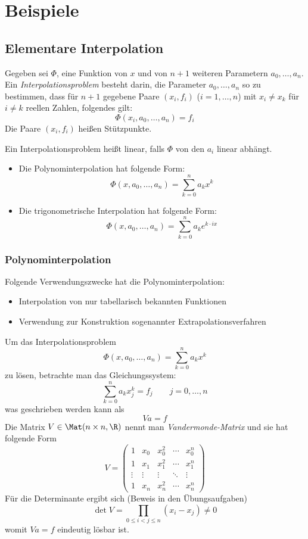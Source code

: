 \documentclass[a4paper]{scrartcl}
\numberwithin{equation}{section}
\begin{document}
\section{Beispiele}

\subsection{Elementare Interpolation}

Gegeben sei $\Phi$, eine Funktion von $x$ und von $n+1$ weiteren Parametern $a_0,\dotsc, a_n$.
Ein \emph{Interpolationsproblem} besteht darin, die Parameter $a_0,\dotsc, a_n$ so zu bestimmen, dass für $n+1$ gegebene Paare $(x_i, f_i)$ ($i=1,\dotsc,n$) mit $x_i\neq x_k$ für $i\neq k$ reellen Zahlen, folgendes gilt:
\begin{equation}
	\label{eq:5.1}
	\Phi(x_i, a_0,\dotsc, a_n) = f_i
\end{equation}
Die Paare $(x_i, f_i)$ heißen Stützpunkte.

Ein Interpolationsproblem heißt linear, falls $\Phi$ von den $a_i$ linear abhängt.

\begin{ex*}
	\begin{itemize}
		\item
			Die Polynominterpolation hat folgende Form:
			\[
				\Phi(x,a_0,\dotsc, a_n) = \sum_{k=0}^n a_kx^k
			\]
		\item
			Die trigonometrische Interpolation hat folgende Form:
			\[
				\Phi(x,a_0,\dotsc, a_n) = \sum_{k=0}^n a_ke^{k\cdot ix}
			\]
	\end{itemize}
\end{ex*}

\subsubsection{Polynominterpolation}

Folgende Verwendungszwecke hat die Polynominterpolation:
\begin{itemize}
	\item
		Interpolation von nur tabellarisch bekannten Funktionen
	\item
		Verwendung zur Konstruktion sogenannter Extrapolationsverfahren
\end{itemize}
Um das Interpolationsproblem
\[
	\Phi(x,a_0,\dotsc, a_n) = \sum_{k=0}^n a_kx^k
\]
zu lösen, betrachte man das Gleichungssystem:
\begin{equation}
	\sum_{k=0}^n a_kx_j^k = f_j \qquad j=0,\dotsc, n \label{eq:5.2}
\end{equation}
was geschrieben werden kann als
\[
	V a = f
\]
Die Matrix $V \in \Mat(n\times n, \R)$ nennt man \emph{Vandermonde-Matrix} und sie hat folgende Form
\[
	V = \begin{pmatrix}1 & x_0 & x_0^2 & \cdots & x_0^n\\
	1 & x_1 & x_1^2 &\cdots & x_1^n\\
	\vdots & \vdots & \vdots & \ddots & \vdots \\
	1& x_n & x_n^2  & \cdots & x_n^n
\end{pmatrix}	 
\]
Für die Determinante ergibt sich (Beweis in den Übungsaufgaben)
\[
	\det V = \prod_{0\le i<j\le n}(x_i-x_j) \neq 0
\]
womit $Va = f$ eindeutig lösbar ist.
\end{document}
